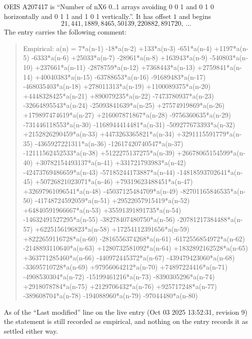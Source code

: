 \documentclass[11pt,a4paper]{article}
\theoremstyle{plain}
\theoremstyle{definition}
\begin{document}
OEIS A207417 is ``Number of nX6 0..1 arrays avoiding 0 0 1 and 0 1 0 horizontally and 0 1 1 and 1 0 1 vertically.''. It has offset
$1$ and begins
\[
21, 441, 1889, 8465, 50139, 220882, 891720,\ \dots
\]
The entry carries the following comment:
\begin{quote}\small
Empirical: a(n) = 7*a(n-1) -18*a(n-2) +133*a(n-3) -651*a(n-4) +1197*a(n-5) -6333*a(n-6) +25033*a(n-7) -28961*a(n-8) +163943*a(n-9) -540803*a(n-10) +237661*a(n-11) -2878759*a(n-12) +7368443*a(n-13) +2759841*a(n-14) +40040383*a(n-15) -63788653*a(n-16) -91689483*a(n-17) -468035403*a(n-18) +278011313*a(n-19) +1100089375*a(n-20) +4448328425*a(n-21) +890079235*a(n-22) -7473780937*a(n-23) -32664895543*a(n-24) -25093841639*a(n-25) +27574919869*a(n-26) +179897474619*a(n-27) +216007871867*a(n-28) -9756360635*a(n-29) -731446118553*a(n-30) -1168944414481*a(n-31) -509277673393*a(n-32) +2152826290459*a(n-33) +4473263365821*a(n-34) +3291115591779*a(n-35) -4365927221311*a(n-36) -12617420740547*a(n-37) -12111562452533*a(n-38) +5122275137275*a(n-39) +26678065154599*a(n-40) +30782154493137*a(n-41) +331721793983*a(n-42) -42473769486659*a(n-43) -57185244173887*a(n-44) -14818593702641*a(n-45) +50726821023071*a(n-46) +79319623488451*a(n-47) +32697961096541*a(n-48) -45037125484709*a(n-49) -82701165846535*a(n-50) -41748724592059*a(n-51) +29522057915419*a(n-52) +64840591966667*a(n-53) +35591391891735*a(n-54) -14632491527295*a(n-55) -38278407480750*a(n-56) -20781217384488*a(n-57) +6225156196823*a(n-58) +17254112391656*a(n-59) +8222659116728*a(n-60) -2816556374268*a(n-61) -6172556854972*a(n-62) -2148893110640*a(n-63) +1280732581092*a(n-64) +1832892162528*a(n-65) +363771285460*a(n-66) -440972445372*a(n-67) -439479423060*a(n-68) -33695710728*a(n-69) +97956064212*a(n-70) +74897224416*a(n-71) -4908530304*a(n-72) -15199461216*a(n-73) -8390305296*a(n-74) +2918078784*a(n-75) +2129706432*a(n-76) +925717248*a(n-77) -389608704*a(n-78) -194088960*a(n-79) -97044480*a(n-80)
\end{quote}
As of the ``Last modified'' line on the live entry (Oct 03 2025 13:52:31, revision
9) the statement is still recorded as empirical, and nothing on the entry
records it as settled either way.
\end{document}
